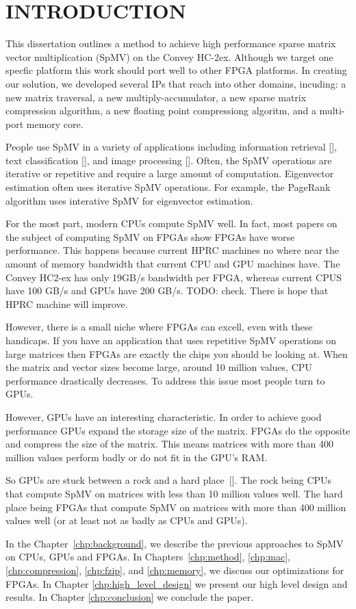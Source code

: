 \chapter{INTRODUCTION}
\label{chp:introduction}
This dissertation outlines a method to achieve high performance sparse matrix vector multiplication (SpMV) on the Convey HC-2ex. Although we target one specfic platform this work should port well to other FPGA platforms. In creating our solution, we developed several IPs that reach into other domains, incuding: a new matrix traversal, a new multiply-accumulator, a new sparse matrix compression algorithm, a new floating point compressiong algoritm, and a multi-port memory core.

\par People use SpMV in a variety of applications including information retrieval [\cite{prelim:page}], text classification [\cite{prelim:townsend2}], and image processing [\cite{prelim:wang}]. Often, the SpMV operations are iterative or repetitive and require a large amount of computation. Eigenvector estimation often uses iterative SpMV operations. For example, the PageRank algorithm uses interative SpMV for eigenvector estimation.

\par For the most part, modern CPUs compute SpMV well. In fact, most papers on the subject of computing SpMV on FPGAs show FPGAs have worse performance. This happens because current HPRC machines no where near the amount of memory bandwidth that current CPU and GPU machines have. The Convey HC2-ex has only 19GB/s bandwidth per FPGA, whereas current CPUS have 100 GB/s and GPUs have 200 GB/s. TODO: check. There is hope that HPRC machine will improve.

However, there is a small niche where FPGAs can excell, even with these handicaps. If you have  an application that uses repetitive SpMV operations on large matrices then FPGAs are exactly the chips you should be looking at. When the matrix and vector sizes  become large, around 10 million values, CPU performance drastically decreases. To address this issue most people turn to GPUs.
\par However, GPUs have an interesting characteristic. In order to achieve good performance GPUs expand the storage size of the matrix. FPGAs do the opposite and compress the size of the matrix. This means matrices with more than 400 million values perform badly or do not fit in the GPU's RAM.
\par So GPUs are stuck between a rock and a hard place~[\cite{prelim:davis0}]. The rock being CPUs that compute SpMV on matrices with less than 10 million values well. The hard place being FPGAs that compute SpMV on matrices with more than 400 million values well (or at least not as badly as CPUs and GPUs).
\par In the Chapter~\ref{chp:background}, we describe the previous approaches to SpMV on CPUs, GPUs and FPGAs. In Chapters~\ref{chp:method}, \ref{chp:mac}, \ref{chp:compression}, \ref{chp:fzip}, and \ref{chp:memory}, we discuss our optimizations for FPGAs. In Chapter \ref{chp:high_level_design} we present our high level design and results. In Chapter \ref{chp:conclusion} we conclude the paper.

